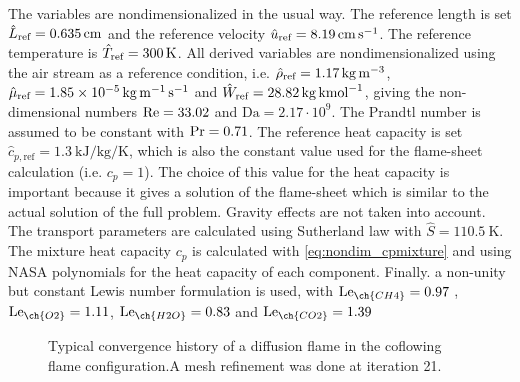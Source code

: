 The variables are nondimensionalized in the usual way. The reference length is set $\hat L_{\text{ref}} =  \SI{0.635}{\centi \meter}$ and the reference velocity $\hat u_{\text{ref}} =\SI{8.19}{\centi \meter \per \second}$. The reference temperature is $\hat T_{\text{ref}} =\SI{300}{K}$.  All derived variables are nondimensionalized using the air stream as a reference condition, i.e. $\hat \rho_{\text{ref}} = \SI{1.17}{\kilo \gram \per \cubic \meter}$, $\hat \mu_{\text{ref}} = \SI{1.85e-5}{\kilo \gram \per \meter \per \second}$ and $\hat W_{\text{ref}} = \SI{28.82}{\kilo \gram \per \kilo\mole}$, giving the non-dimensional numbers $\text{Re} = 33.02$ and $\text{Da} = 2.17\cdot 10^9$. The Prandtl number is assumed to be constant with $\text{Pr} = 0.71$. The reference heat capacity is set $\hat{c}_{p,\text{ref}}= \SI{1.3}{\kilo \joule \per \kilo \gram \per \kelvin}$, which is also the constant value used for the flame-sheet calculation (i.e. $c_p = 1$). The choice of this value for the heat capacity is important because it gives a solution of the flame-sheet which is similar to the actual solution of the full problem. Gravity effects are not taken into account. The transport parameters are calculated using Sutherland law with $\hat{S} = \SI{110.5}{\kelvin}$. The mixture heat capacity $c_p$ is calculated with \cref{eq:nondim_cpmixture} and using NASA polynomials for the heat capacity of each component. Finally. a non-unity but constant Lewis number formulation is used, with
$\Lewis_{\ch{CH4}} =  0.97 $ , $\Lewis_{\ch{O2}} = 1.11 $, $\Lewis_{\ch{H2O}} = 0.83 $ and $\Lewis_{\ch{CO2}} = 1.39 $ \citep{smookePremixedNonpremixedTest1991}
\begin{figure}[b!]
	\centering
	\caption{Typical convergence history of a diffusion flame in the coflowing flame configuration.A mesh refinement was done at iteration 21. }
	\label{fig:CoFlow_ConvergenceStory}
\end{figure}
